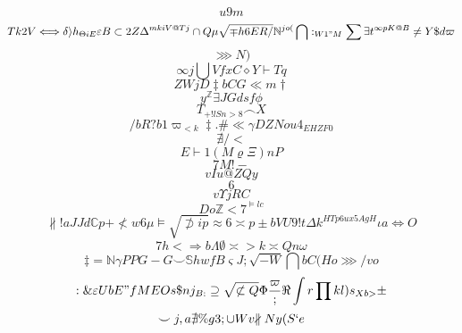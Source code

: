 \documentclass[12pt]{article}
\begin{document}
        \begin{minipage}[t][0pt]{\linewidth}

        \[u9m\]
\[Tk2V {\iff}\delta\rangle h_{\Theta i E}\varepsilon B\subset 2 Z\Delta^{mkiV@Tj}\cap Q\mu\sqrt{\mp h 6 E R /}\mathbb{N}^{jo(}\bigcap :_{W1"M}\sum\exists t^{\infty p K @ B}\neq Y\$ d\varpi\]
\[\ggg N )\]
\[\infty j\bigcup V f x C\diamond Y\vdash T q\]
\[Z {WjD}\ddagger b C G\ll m\dagger\]
\[y^{\mathbb{Z}}\exists J G d s f\phi\]
\[T_{+!lSn>8}\frown X\]
\[/bR?b1\varpi_{<k}\ddagger .\#\ll\gamma D Z N o u 4_{EHZF0}\]
\[\nexists / <\]
\[E\vdash 1 ( M\varrho\Xi ) n P\]
\[7M!-\]
\[vIu@ZQy\]
\[6\]
\[v\Upsilon j R C\]
\[D o\mathbb{Z} < 7^{\models l c}\]
\[\nparallel ! a J J d\mathbb{C} p +\nless w 6\mu\models\sqrt{\not\supset i p}\approx 6\asymp p\pm b V U 9 ! t\Delta k^{HTp6ux5AgH}\iota a\Leftrightarrow O\]
\[7h<\Rightarrow b\Lambda\emptyset\asymp > k\asymp Q n\omega\]
\[\ddagger =\mathbb{N}\gamma P P G - G\smile\mathbb{S} h w f B\varsigma J ;\sqrt{-W}\bigcap b C ( H o\ggg / v o\]
\[:\&\varepsilon U b E " f M E O s\$ n j_{B:}\supseteq\sqrt{\not\subset Q}\Phi\frac{\varpi}{ ;}\Re\int {r}\prod k l ) s_{Xb>}\pm\]
\[\smile j , a\nexists\% g 3 ;\cup W v {\nparallel N y ( S ` e}
        \]
\end{minipage}
\end{document}
